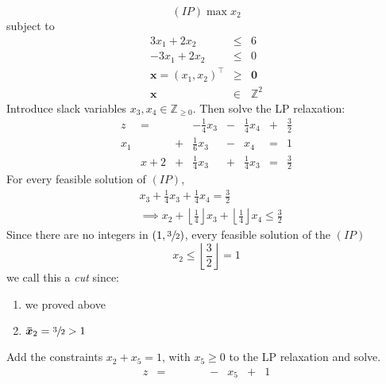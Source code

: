 \begin{exbox}
    \begin{example}
        \[ (IP) \max x_2 \]
        subject to
        \[
            \begin{array}{ccc}
                3x_1+2x_2             & \leqslant & 6            \\
                -3x_1+2x_2            & \leqslant & 0            \\
                \bm{x}=(x_1,x_2)^\top & \geqslant & \bm{0}       \\
                \bm{x}                & \in       & \mathbb{Z}^2
            \end{array}
        \]
        Introduce slack variables $ x_3, x_4\in\mathbb{Z}_{\geqslant 0} $.
        Then solve the LP relaxation:
        \[
            \begin{array}{cccccccc}
                z   & =   &   & -\frac{1}{4} x_3 & - & \frac{1}{4} x_4 & + & \frac{3}{2} \\
                x_1 &     & + & \frac{1}{6} x_3  & - & x_4             & = & 1           \\
                    & x+2 & + & \frac{1}{4} x_3  & + & \frac{1}{4} x_3 & = & \frac{3}{2}
            \end{array}
        \]
        For every feasible solution of $ (IP) $,
        \begin{align*}
             & x_3+\frac{1}{4} x_3+ \frac{1}{4} x_4 = \frac{3}{2}                                                                          \\
             & \implies x_2 + \left\lfloor \frac{1}{4} \right\rfloor x_3 + \left\lfloor \frac{1}{4} \right\rfloor x_4\leqslant \frac{3}{2}
        \end{align*}
        Since there are no integers in $ (1,\sfrac{3}{2}) $, every feasible solution of the $ (IP) $
        \[ x_2\leqslant \left\lfloor \frac{3}{2} \right\rfloor=1 \]
        we call this a \emph{cut} since:
        \begin{enumerate}[label=(\roman*)]
            \item we proved above
            \item $ \bm{\bar{x}}_2=\sfrac{3}{2}>1  $
        \end{enumerate}
        Add the constraints $ x_2+x_5=1 $, with $ x_5\geqslant 0 $ to the LP relaxation and solve.
        \[
            \begin{array}{cccccccccc}
                z   & = &     &     &   &                 & - & x_5             & + & 1           \\

\end{array}\]
\end{example}
\end{exbox}
